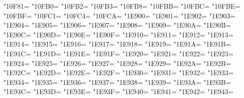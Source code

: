 \XeTeXcharclass"10F81=\KclassArabD
\XeTeXcharclass"10FB0=\KclassArabD
\XeTeXcharclass"10FB2=\KclassArabD
\XeTeXcharclass"10FB3=\KclassArabD
\XeTeXcharclass"10FB8=\KclassArabD
\XeTeXcharclass"10FBB=\KclassArabD
\XeTeXcharclass"10FBC=\KclassArabD
\XeTeXcharclass"10FBE=\KclassArabD
\XeTeXcharclass"10FBF=\KclassArabD
\XeTeXcharclass"10FC1=\KclassArabD
\XeTeXcharclass"10FC4=\KclassArabD
\XeTeXcharclass"10FCA=\KclassArabD
\XeTeXcharclass"1E900=\KclassArabD
\XeTeXcharclass"1E901=\KclassArabD
\XeTeXcharclass"1E902=\KclassArabD
\XeTeXcharclass"1E903=\KclassArabD
\XeTeXcharclass"1E904=\KclassArabD
\XeTeXcharclass"1E905=\KclassArabD
\XeTeXcharclass"1E906=\KclassArabD
\XeTeXcharclass"1E907=\KclassArabD
\XeTeXcharclass"1E908=\KclassArabD
\XeTeXcharclass"1E909=\KclassArabD
\XeTeXcharclass"1E90A=\KclassArabD
\XeTeXcharclass"1E90B=\KclassArabD
\XeTeXcharclass"1E90C=\KclassArabD
\XeTeXcharclass"1E90D=\KclassArabD
\XeTeXcharclass"1E90E=\KclassArabD
\XeTeXcharclass"1E90F=\KclassArabD
\XeTeXcharclass"1E910=\KclassArabD
\XeTeXcharclass"1E911=\KclassArabD
\XeTeXcharclass"1E912=\KclassArabD
\XeTeXcharclass"1E913=\KclassArabD
\XeTeXcharclass"1E914=\KclassArabD
\XeTeXcharclass"1E915=\KclassArabD
\XeTeXcharclass"1E916=\KclassArabD
\XeTeXcharclass"1E917=\KclassArabD
\XeTeXcharclass"1E918=\KclassArabD
\XeTeXcharclass"1E919=\KclassArabD
\XeTeXcharclass"1E91A=\KclassArabD
\XeTeXcharclass"1E91B=\KclassArabD
\XeTeXcharclass"1E91C=\KclassArabD
\XeTeXcharclass"1E91D=\KclassArabD
\XeTeXcharclass"1E91E=\KclassArabD
\XeTeXcharclass"1E91F=\KclassArabD
\XeTeXcharclass"1E920=\KclassArabD
\XeTeXcharclass"1E921=\KclassArabD
\XeTeXcharclass"1E922=\KclassArabD
\XeTeXcharclass"1E923=\KclassArabD
\XeTeXcharclass"1E924=\KclassArabD
\XeTeXcharclass"1E925=\KclassArabD
\XeTeXcharclass"1E926=\KclassArabD
\XeTeXcharclass"1E927=\KclassArabD
\XeTeXcharclass"1E928=\KclassArabD
\XeTeXcharclass"1E929=\KclassArabD
\XeTeXcharclass"1E92A=\KclassArabD
\XeTeXcharclass"1E92B=\KclassArabD
\XeTeXcharclass"1E92C=\KclassArabD
\XeTeXcharclass"1E92D=\KclassArabD
\XeTeXcharclass"1E92E=\KclassArabD
\XeTeXcharclass"1E92F=\KclassArabD
\XeTeXcharclass"1E930=\KclassArabD
\XeTeXcharclass"1E931=\KclassArabD
\XeTeXcharclass"1E932=\KclassArabD
\XeTeXcharclass"1E933=\KclassArabD
\XeTeXcharclass"1E934=\KclassArabD
\XeTeXcharclass"1E935=\KclassArabD
\XeTeXcharclass"1E936=\KclassArabD
\XeTeXcharclass"1E937=\KclassArabD
\XeTeXcharclass"1E938=\KclassArabD
\XeTeXcharclass"1E939=\KclassArabD
\XeTeXcharclass"1E93A=\KclassArabD
\XeTeXcharclass"1E93B=\KclassArabD
\XeTeXcharclass"1E93C=\KclassArabD
\XeTeXcharclass"1E93D=\KclassArabD
\XeTeXcharclass"1E93E=\KclassArabD
\XeTeXcharclass"1E93F=\KclassArabD
\XeTeXcharclass"1E940=\KclassArabD
\XeTeXcharclass"1E941=\KclassArabD
\XeTeXcharclass"1E942=\KclassArabD
\XeTeXcharclass"1E943=\KclassArabD

